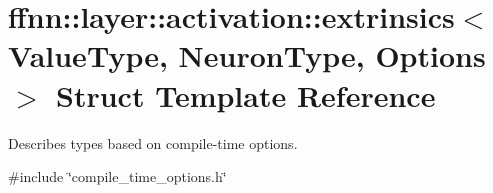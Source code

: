 \hypertarget{structffnn_1_1layer_1_1activation_1_1extrinsics}{\section{ffnn\-:\-:layer\-:\-:activation\-:\-:extrinsics$<$ Value\-Type, Neuron\-Type, Options $>$ Struct Template Reference}
\label{structffnn_1_1layer_1_1activation_1_1extrinsics}
}


Describes types based on compile-\/time options.  




{\ttfamily \#include \char`\"{}compile\-\_\-time\-\_\-options.\-h\char`\"{}}

